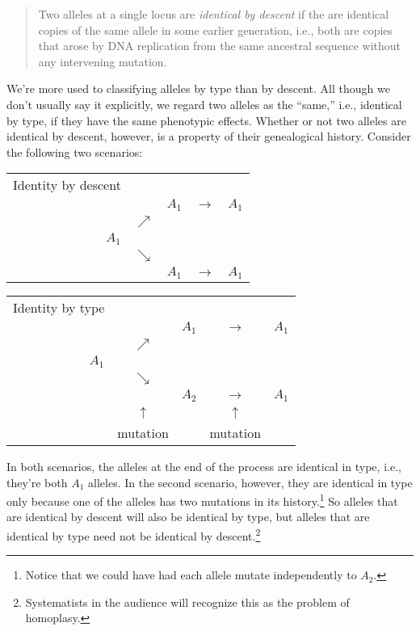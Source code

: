 \begin{quote}
Two alleles at a single locus are {\it identical by descent\/} if the
are identical copies of the same allele in some earlier generation,
i.e., both are copies that arose by DNA replication from the same
ancestral sequence without any intervening mutation.
\end{quote}

We're more used to classifying alleles by type than by descent. All
though we don't usually say it explicitly, we regard two alleles as
the ``same,'' i.e., identical by type,  if
they have the same phenotypic effects. Whether or not two alleles are
identical by descent, however, is a property of their genealogical
history. Consider the following two scenarios:

\begin{center}
\begin{tabular}{rcccc}
Identity by descent \\
      &            & $A_1$ & $\rightarrow$ & $A_1$ \\
      & $\nearrow$ &       &               & \\
$A_1$ &            &       &               & \\
      & $\searrow$ &       &               & \\
      &            & $A_1$ & $\rightarrow$ & $A_1$ 
\end{tabular}
\end{center}

\begin{center}
\begin{tabular}{rcccc}
Identity by type \\
      &            & $A_1$ & $\rightarrow$ & $A_1$ \\
      & $\nearrow$ &       &               & \\
$A_1$ &            &       &               & \\
      & $\searrow$ &       &               & \\
      &            & $A_2$ & $\rightarrow$ & $A_1$ \\
      & $\uparrow$ &       & $\uparrow$    & \\
      & mutation   &       & mutation      & 
\end{tabular}
\end{center}

In both scenarios, the alleles at the end of the process are identical
in type, i.e., they're both $A_1$ alleles. In the second scenario,
however, they are identical in type only because one of the alleles
has two mutations in its history.\footnote{Notice that we could have
had each allele mutate independently to $A_2$.} So alleles that are
identical by descent will also be identical by type, but alleles that
are identical by type need not be identical by
descent.\footnote{Systematists in the audience will recognize this as
the problem of homoplasy.}

